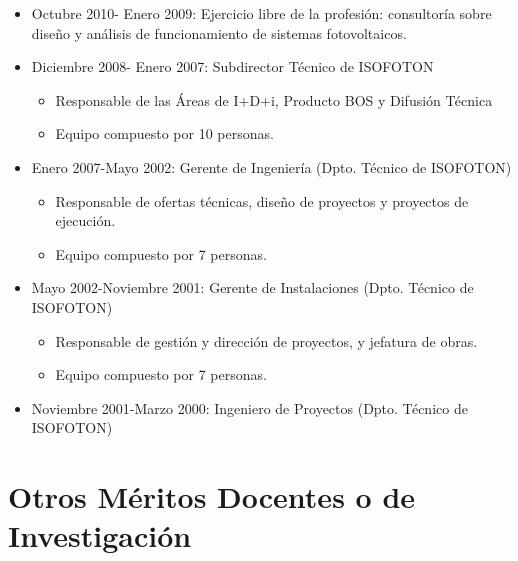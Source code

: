 \documentclass[article, a4paper]{memoir}
\begin{document}
\begin{itemize}
\item Octubre 2010- Enero 2009: Ejercicio libre de la profesión:
consultoría sobre diseño y análisis de funcionamiento de
sistemas fotovoltaicos.

\item Diciembre 2008- Enero 2007: Subdirector Técnico de ISOFOTON

\begin{itemize}
\item Responsable de las Áreas de I+D+i, Producto BOS y Difusión
Técnica
\item Equipo compuesto por 10 personas.
\end{itemize}
\end{itemize}


\begin{itemize}
\item Enero 2007-Mayo 2002: Gerente de Ingeniería (Dpto. Técnico de
ISOFOTON)

\begin{itemize}
\item Responsable de ofertas técnicas, diseño de proyectos y
proyectos de ejecución.
\item Equipo compuesto por 7 personas.
\end{itemize}
\end{itemize}


\begin{itemize}
\item Mayo 2002-Noviembre 2001: Gerente de Instalaciones
(Dpto. Técnico de ISOFOTON)

\begin{itemize}
\item Responsable de gestión y dirección de proyectos, y jefatura de
obras.
\item Equipo compuesto por 7 personas.
\end{itemize}
\end{itemize}


\begin{itemize}
\item Noviembre 2001-Marzo 2000: Ingeniero de Proyectos (Dpto. Técnico
de ISOFOTON)
\end{itemize}



\section{Otros Méritos Docentes o de Investigación}
\label{sec-12}
\end{document}
